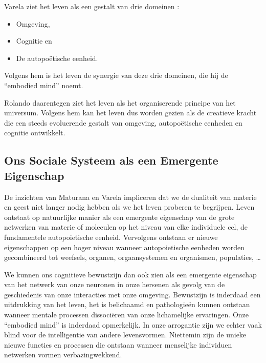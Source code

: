 \documentclass[
  11pt,
]{book}
\providecommand{\tightlist}{%
  \setlength{\itemsep}{0pt}\setlength{\parskip}{0pt}}
\begin{document}
Varela ziet het leven als een gestalt van drie domeinen \citep{capraLuisi2014}:

\begin{itemize}
\tightlist
\item
  Omgeving,
\item
  Cognitie en
\item
  De autopoëtische eenheid.
\end{itemize}

Volgens hem is het leven de synergie van deze drie domeinen, die hij de ``embodied mind'' noemt.

Rolando daarentegen ziet het leven als het organiserende principe van het universum. Volgens hem kan het leven dus worden gezien als de creatieve kracht die een steeds evoluerende gestalt van omgeving, autopoëtische eenheden en cognitie ontwikkelt.

\hypertarget{ons-sociale-systeem-als-een-emergente-eigenschap}{%
\subsection{Ons Sociale Systeem als een Emergente Eigenschap}\label{ons-sociale-systeem-als-een-emergente-eigenschap}}

De inzichten van Maturana en Varela impliceren dat we de dualiteit van materie en geest niet langer nodig hebben als we het leven proberen te begrijpen. Leven ontstaat op natuurlijke manier als een emergente eigenschap van de grote netwerken van materie of moleculen op het niveau van elke individuele cel, de fundamentele autopoietische eenheid. Vervolgens ontstaan er nieuwe eigenschappen op een hoger niveau wanneer autopoietische eenheden worden gecombineerd tot weefsels, organen, orgaansystemen en organismen, populaties, \ldots{}

We kunnen ons cognitieve bewustzijn dan ook zien als een emergente eigenschap van het netwerk van onze neuronen in onze hersenen als gevolg van de geschiedenis van onze interacties met onze omgeving. Bewustzijn is inderdaad een uitdrukking van het leven, het is belichaamd en pathologieën kunnen ontstaan wanneer mentale processen dissociëren van onze lichamelijke ervaringen. Onze ``embodied mind'' is inderdaad opmerkelijk. In onze arrogantie zijn we echter vaak blind voor de intelligentie van andere levensvormen. Niettemin zijn de unieke nieuwe functies en processen die ontstaan wanneer menselijke individuen netwerken vormen verbazingwekkend.
\end{document}
